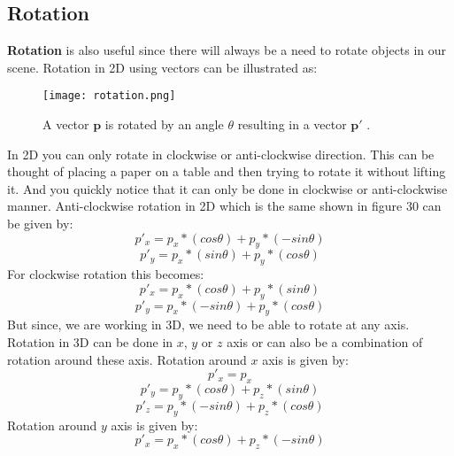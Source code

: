 \documentclass[11pt,a4paper]{article}
\begin{document}
	\subsection{Rotation}
	\textbf{Rotation} is also useful since there will always be a need to rotate objects in our scene. Rotation in 2D using vectors can be illustrated as:
	\begin{figure}[H]
		\centering
		\captionsetup{justification=centering}
		\texttt{[image: rotation.png]}\quad
		\caption{A vector $\boldsymbol{p}$ is rotated by an angle $\theta$ resulting in a vector $\boldsymbol{p'}$ \protect\cite{2dtransformations}.}
	\end{figure}
	\noindent
	In 2D you can only rotate in clockwise or anti-clockwise direction. This can be thought of placing a paper on a table and then trying to rotate it without lifting it. And you quickly notice that it can only be done in clockwise or anti-clockwise manner. Anti-clockwise rotation in 2D which is the same shown in figure 30 can be given by:
	\begin{equation}
		p'_{x} = p_{x}*(cos\theta) + p_{y}*(-sin\theta)
	\end{equation}
	\begin{equation}
		p'_{y} = p_{x}*(sin\theta) + p_{y}*(cos\theta)
	\end{equation}
	For clockwise rotation this becomes:
	\begin{equation}
		p'_{x} = p_{x}*(cos\theta) + p_{y}*(sin\theta)
	\end{equation}
	\begin{equation}
		p'_{y} = p_{x}*(-sin\theta) + p_{y}*(cos\theta)
	\end{equation}
	But since, we are working in 3D, we need to be able to rotate at any axis. Rotation in 3D can be done in $x$, $y$ or $z$ axis or can also be a combination of rotation around these axis. Rotation around $x$ axis is given by:
	\begin{equation}
		p'_{x} = p_{x}
	\end{equation}
	\begin{equation}
		p'_{y} = p_{y}*(cos\theta) + p_{z}*(sin\theta)
	\end{equation}
	\begin{equation}
		p'_{z} = p_{y}*(-sin\theta) + p_{z}*(cos\theta)
	\end{equation}
	Rotation around $y$ axis is given by:
	\begin{equation}
		p'_{x} = p_{x}*(cos\theta) + p_{z}*(-sin\theta)
	\end{equation}
\end{document}
